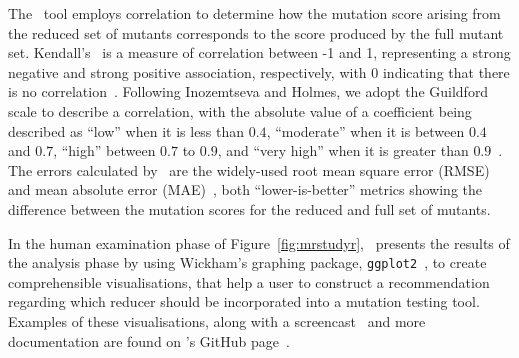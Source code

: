 
The \mr~tool employs correlation to determine how the mutation score arising from the reduced set of mutants corresponds
to the score produced by the full mutant set. Kendall's \taub~is a measure of correlation between -1 and 1, representing
a strong negative and strong positive association, respectively, with 0 indicating that there is no
correlation~\cite{mcleod2015kendall}. Following Inozemtseva and Holmes, we adopt the Guildford scale to describe a
correlation, with the absolute value of a coefficient being described as ``low'' when it is less than $0.4$,
``moderate'' when it is between $0.4$ and $0.7$, ``high'' between $0.7$ to $0.9$, and ``very high'' when it is greater
than $0.9$~\cite{inozemtseva2014coverage}. The errors calculated by \mr~are the widely-used root mean square error
(RMSE) and mean absolute error (MAE)~\cite{chai2014root}, both ``lower-is-better'' metrics showing the difference
between the mutation scores for the reduced and full set of mutants.






In the human examination phase of Figure~\ref{fig:mrstudyr}, \mr~presents the results of the analysis phase by using
Wickham's graphing package, \texttt{ggplot2}~\cite{ggplot2}, to create comprehensible visualisations, that help a user
to construct a recommendation regarding which reducer should be incorporated into a mutation testing tool. Examples of
these visualisations, along with a screencast~\cite{asciinema} and more documentation are found on \mr's GitHub
page~\cite{tool}.


